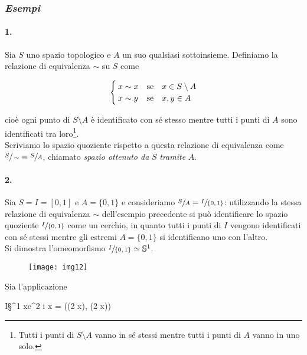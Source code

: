 \subsubsection{\textit{Esempi}}

\paragraph{1.}

Sia $ S $ uno spazio topologico e $ A $ un suo qualsiasi sottoinsieme. Definiamo la relazione di equivalenza $ \sim $ su $ S $ come

\begin{equation}
	\begin{cases}
		x \sim x & \qq*{se} x \in S \setminus A\\
		x \sim y & \qq*{se} x,y \in A
	\end{cases}
\end{equation}

cioè ogni punto di $ S \setminus A $ è identificato con sé stesso mentre tutti i punti di $ A $ sono identificati tra loro\footnote{%
	Tutti i punti di $ S \setminus A $ vanno in sé stessi mentre tutti i punti di $ A $ vanno in uno solo.%
}.\\
Scriviamo lo spazio quoziente rispetto a questa relazione di equivalenza come $ \sfrac{S}{\sim} = \sfrac{S}{A} $, chiamato \textit{spazio ottenuto da} $ S $ \textit{tramite} $ A $.

\paragraph{2.}

Sia $ S = I = [0,1] $ e $ A = \{0,1\} $ e consideriamo $ \sfrac{S}{A} = \sfrac{I}{\{0,1\}} $: utilizzando la stessa relazione di equivalenza $ \sim $ dell'esempio precedente si può identificare lo spazio quoziente $ \sfrac{I}{\{0,1\}} $ come un cerchio, in quanto tutti i punti di $ I $ vengono identificati con sé stessi mentre gli estremi $ A = \{0,1\} $ si identificano uno con l'altro.\\
Si dimostra l'omeomorfismo $ \sfrac{I}{\{0,1\}} \simeq \mathbb{S}^{1} $.

\begin{figure}[H]
	\centering
	\texttt{[image: img12]}
\end{figure}

Sia l'applicazione

%
	{I}{\S^{1}}%
	{x}{e^{2 i \pi x} = (\cos(2 \pi x), \sin(2 \pi x))}

